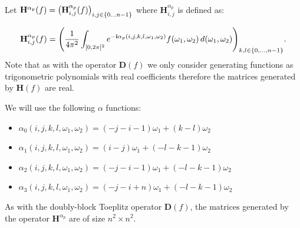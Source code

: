 Let $\mathbf{H}^{\alpha_p} (f) = \leftmat \mathbf{H}^{\alpha_p}_{i,j}(f) \rightmat_{i,j \in \{0 \ldots n-1 \}}$ where $\mathbf{H}^{\alpha_p}_{i,j}$ is defined as:

\begin{equation}
\mathbf{H}^{\alpha_p}_{i,j}(f) =\leftmat \frac{1}{4\pi^{2}}\int_{[0,2\pi]^{2}} e^{-\mathbf{i} \alpha_p(i, j, k, l, \omega_1, \omega_2)}  f(\omega_{1},\omega_{2})\,d(\omega_{1},\omega_{2})
\rightmat_{k,l \in \{0, \ldots, n-1 \}} .
\end{equation}
Note that as with the operator $\mathbf{D}(f)$ we only consider generating functions as trigonometric polynomials with real coefficients therefore the matrices generated by $\mathbf{H}(f)$ are real. 

We will use the following $\alpha$ functions:
\begin{itemize}
    \item[] $\alpha_0(i, j, k, l, \omega_1, \omega_2) = (-j-i-1)\omega_1 + (k-l)\omega_2$
    \item[] $\alpha_1(i, j, k, l, \omega_1, \omega_2) = (i-j)\omega_1 + (-l-k-1)\omega_2$
    \item[] $\alpha_2(i, j, k, l, \omega_1, \omega_2) = (-j-i-1)\omega_1 + (-l-k-1)\omega_2$
    \item[] $\alpha_3(i, j, k, l, \omega_1, \omega_2) = (-j-i+n)\omega_1 + (-l-k-1)\omega_2$
\end{itemize}
As with the doubly-block Toeplitz operator $\mathbf{D}(f)$, the matrices generated by the operator $\mathbf{H}^{\alpha_p}$ are of size $n^2 \times n^2$. 

